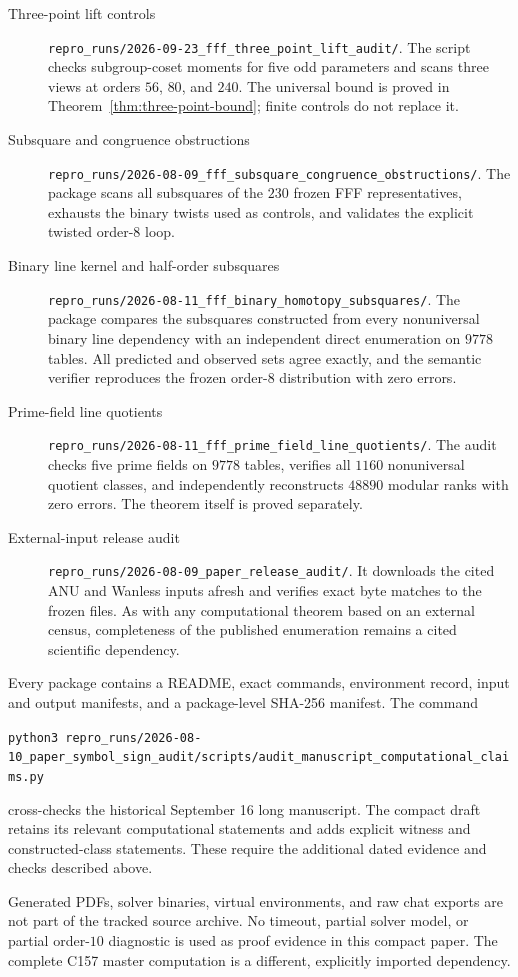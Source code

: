 \begin{description}
\item[Three-point lift controls]
\nolinkurl{repro_runs/2026-09-23_fff_three_point_lift_audit/}.
The script checks subgroup-coset moments for five odd parameters and scans
three views at orders $56$, $80$, and $240$. The universal bound is proved
in Theorem~\ref{thm:three-point-bound}; finite controls do not replace it.

\item[Subsquare and congruence obstructions]
\nolinkurl{repro_runs/2026-08-09_fff_subsquare_congruence_obstructions/}.
The package scans all subsquares of the $230$ frozen FFF representatives,
exhausts the binary twists used as controls, and validates the explicit
twisted order-$8$ loop.

\item[Binary line kernel and half-order subsquares]
\nolinkurl{repro_runs/2026-08-11_fff_binary_homotopy_subsquares/}.
The package compares the subsquares constructed from every nonuniversal
binary line dependency with an independent direct enumeration on $9778$
tables.  All predicted and observed sets agree exactly, and the semantic
verifier reproduces the frozen order-$8$ distribution with zero errors.

\item[Prime-field line quotients]
\nolinkurl{repro_runs/2026-08-11_fff_prime_field_line_quotients/}.
The audit checks five prime fields on $9778$ tables, verifies all $1160$
nonuniversal quotient classes, and independently reconstructs $48890$
modular ranks with zero errors.  The theorem itself is proved separately.

\item[External-input release audit]
\nolinkurl{repro_runs/2026-08-09_paper_release_audit/}.
It downloads the cited ANU and Wanless inputs afresh and verifies exact byte
matches to the frozen files.  As with any computational theorem based on an
external census, completeness of the published enumeration remains a cited
scientific dependency.
\end{description}

Every package contains a README, exact commands, environment record, input
and output manifests, and a package-level SHA-256 manifest.  The command
\begin{center}
\small\texttt{python3 }\nolinkurl{repro_runs/2026-08-10_paper_symbol_sign_audit/scripts/audit_manuscript_computational_claims.py}
\end{center}
cross-checks the historical September 16 long manuscript. The compact
draft retains its relevant computational statements and adds explicit
witness and constructed-class statements. These require the additional
dated evidence and checks described above.

Generated PDFs, solver binaries, virtual environments, and raw chat exports
are not part of the tracked source archive.  No timeout, partial solver model,
or partial order-$10$ diagnostic is used as proof evidence in this compact
paper. The complete C157 master computation is a different, explicitly
imported dependency.
